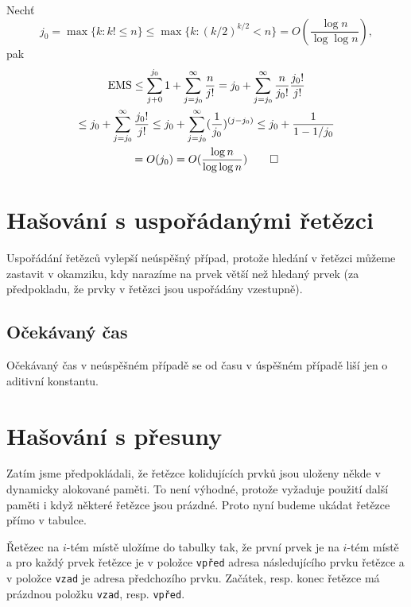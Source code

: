 Nechť
\[
j_0 
=    \max\{k: k! \leq n \}
\leq \max\{k: (k/2)^{k/2} < n \}
= O( \frac{\log n}{\log\log n} ), 
\]
pak
\begin{multline}
\text{EMS}
\leq \sum_{j+0}^{j_0} 1 + \sum_{j=j_0}^\infty \frac n{j!}
=    j_0 + \sum_{j=j_0}^\infty \frac n{j_0!} \frac{j_0!}{j!}\\
\leq j_0 + \sum_{j=j_0}^\infty \frac{j_0!}{j!}
\leq j_0 + \sum_{j=j_0}^\infty (\frac 1{j_0})^{(j-j_0)} %
\leq j_0 + \frac 1{1 - 1/j_0}\\
= O(j_0) = O ( \frac{\log n}{\log\log n} )
\qed
\end{multline}


\section{Hašování s uspořádanými řetězci}

Uspořádání řetězců vylepší neúspěšný případ, protože hledání v řetězci
můžeme zastavit v okamziku, kdy narazíme na prvek větší než hledaný prvek
(za předpokladu, že prvky v řetězci jsou uspořádány vzestupně).

\subsection{Očekávaný čas}

Očekávaný čas v neúspěšném případě se od času v úspěšném případě liší
jen o aditivní konstantu.


\section{Hašování s přesuny}

Zatím jsme předpokládali, že řetězce kolidujících prvků jsou uloženy
někde v dynamicky alokované paměti. 
To není výhodné, protože vyžaduje použití další paměti i když některé 
řetězce jsou prázdné.
Proto nyní budeme ukádat řetězce přímo v tabulce.

Řetězec na $i$-tém místě uložíme do tabulky tak, že 
první prvek je na $i$-tém místě a
pro každý prvek řetězce je v položce {\tt vpřed} adresa následujícího prvku
řetězce a v položce {\tt vzad} je adresa předchozího prvku. Začátek,
resp. konec řetězce má prázdnou položku {\tt vzad}, resp. {\tt vpřed}.

